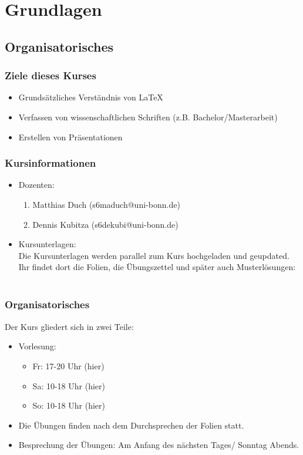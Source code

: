 \section{Grundlagen}
\subsection{Organisatorisches}

\begin{frame}
\frametitle{Ziele dieses Kurses}
\begin{itemize}[<+->]
  \item Grundsätzliches Verständnis von \LaTeX
  \item Verfassen von wissenschaftlichen Schriften (z.B. Bachelor/Masterarbeit)
  \item Erstellen von Präsentationen
\end{itemize}
\end{frame}

\begin{frame}
\frametitle{Kursinformationen}
\begin{itemize}
\item Dozenten:
\begin{enumerate}
\item Matthias Duch (s6maduch@uni-bonn.de)
\item Dennis Kubitza (s6dekubi@uni-bonn.de)
\end{enumerate} 
\pause
\item Kursunterlagen: \\
Die Kursunterlagen werden parallel zum Kurs hochgeladen und geupdated. Ihr findet dort die Folien, die Übungszettel und später auch Musterlösungen: \\ \ \\
\centering{}
\end{itemize}
\end{frame}

\begin{frame}
\frametitle{Organisatorisches}
Der Kurs gliedert sich in zwei Teile:
\begin{itemize}[<+->]
  \item  Vorlesung: %
   \begin{itemize}[<+->]
   \item Fr: 17-20 Uhr (hier)
   \item Sa: 10-18 Uhr (hier)
   \item So: 10-18 Uhr (hier)
   \end{itemize}
  \item  Die Übungen finden nach dem Durchsprechen der Folien statt.
  \item  Besprechung der Übungen: Am Anfang des nächsten Tages/ Sonntag Abends.
\end{itemize}
\end{frame}

